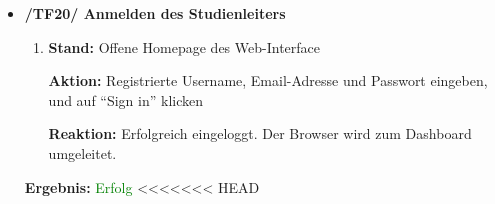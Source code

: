 \documentclass[a4paper]{scrreprt}
\begin{document}
\begin{itemize}
		                          \item \textbf{/TF20/ Anmelden des Studienleiters}
		                              \begin{enumerate}
		                                  \item \par \textbf{Stand: }Offene Homepage des Web-Interface
		                                      \par \textbf{Aktion: }Registrierte Username, Email-Adresse und Passwort eingeben, und auf “Sign in” klicken
		                                      \par \textbf{Reaktion: }Erfolgreich eingeloggt. Der Browser wird zum Dashboard umgeleitet.
		                              \end{enumerate}		
		      		           \vspace*{0.3cm}
		      		           \par \textbf{Ergebnis: }\textcolor{green}{Erfolg}
		      		           \vspace*{0.6cm}
<<<<<<< HEAD


\end{itemize}
\end{document}
